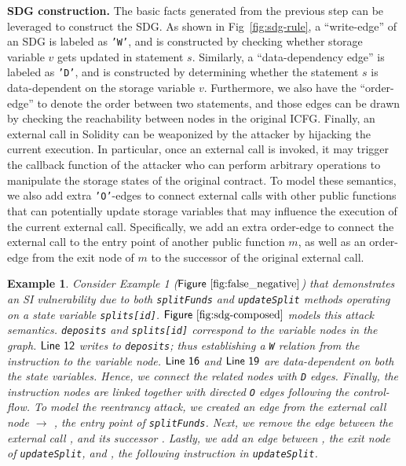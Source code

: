 \documentclass[conference, romanappendices]{tex/IEEEtran}
\theoremstyle{bfnote}
\newcommand{\solidity}{{\sc Solidity}\xspace}
\newcommand{\reentrancy}{{reentrancy}\xspace}
\newcommand{\Line}[1]{\ensuremath{\sf Line~ #1}}
\newcommand{\Fig}[1]{\ensuremath{\sf Figure~\ref{#1}}}
\newcommand*\circledtext[1]{\tikz[baseline=(char.base)]{\node[shape=circle,fill,inner sep=1pt] (char) {\textcolor{white}{\small{#1}}};}}
\newtheorem{example}{Example}
\begin{document}
\noindent
\textbf{SDG construction.}
The basic facts generated from the previous step can be leveraged to construct the SDG.
As shown in Fig~\ref{fig:sdg-rule}, a ``write-edge'' of an {SDG\EndAccSupp{}} is labeled as \texttt{'W'}, and is constructed by checking whether storage variable $v$ gets updated in statement $s$.
Similarly, a ``data-dependency edge'' is labeled as \texttt{'D'}, and is constructed by determining whether the statement $s$ is data-dependent on the storage variable $v$.
Furthermore, we also have the ``order-edge'' to denote the order between two statements, and those edges can be drawn by checking the reachability between nodes in the original ICFG.
Finally, an external call in \solidity can be weaponized by the attacker by hijacking the current execution.
In particular, once an external call is invoked, it may trigger the callback function of the attacker who can perform arbitrary operations to manipulate the storage states of the original contract.
To model these semantics, we also add extra \texttt{'O'}-edges to connect external calls with other public functions that can potentially update storage variables that may influence the execution of the current external call.
Specifically, we add an extra order-edge to connect the external call to the entry point of another public function $m$, as well as an order-edge from the exit node of $m$ to the successor of the original external call.
\vspace{-1.5mm}
\noindent
\begin{example}
Consider Example 1 (\Fig{fig:false_negative}) that demonstrates an SI vulnerability due to both \texttt{splitFunds} and \texttt{updateSplit} methods operating on a state variable \texttt{splits[id]}.
\Fig{fig:sdg-composed} models this attack semantics.
\texttt{deposits} and \texttt{splits[id]} correspond to the variable nodes in the graph.
\Line{12} writes to \texttt{deposits}; thus establishing a \texttt{W} relation from the instruction to the variable node.
\Line{16} and \Line{19} are data-dependent on both the state variables.
Hence, we connect the related nodes with \texttt{D} edges.
Finally, the instruction nodes are linked together with directed \texttt{O} edges following the control-flow.
To model the \reentrancy attack, we created an edge from the external call node \circledtext{2} $\rightarrow$ \circledtext{4}, the entry point of \texttt{splitFunds}.
Next, we remove the edge between the external call \circledtext{2}, and its successor \circledtext{3}.
{Lastly\EndAccSupp{}}, we add an edge between \circledtext{5}, the exit node of \texttt{updateSplit}, and \circledtext{3}, the following instruction in \texttt{updateSplit}.
\end{example}
\end{document}
